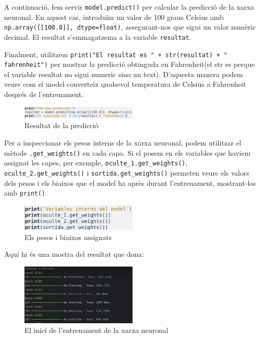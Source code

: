 A continuació, fem servir \texttt{model.predict()} per calcular la predicció de la xarxa neuronal. En aquest cas, introduïm un valor de 100 graus Celsius amb \texttt{np.array([[100.0]], dtype=float)}, assegurant-nos que sigui un valor numèric decimal. El resultat s’emmagatzema a la variable \texttt{resultat}.

Finalment, utilitzem \texttt{print("El resultat es " + str(resultat) + " fahrenheit")} per mostrar la predicció obtinguda en Fahrenheit(el str es perque el variable resultat no sigui numeric sino un text). D’aquesta manera podem veure com el model converteix qualsevol temperatura de Celsius a Fahrenheit després de l’entrenament.


\begin{figure}[H]
    \centering
    \includegraphics[width=0.5\textwidth]{./figures/8.png}
    \caption{Resultat de la predicció}
\end{figure}

Per a inspeccionar els pesos interns de la xarxa neuronal, podem utilitzar el mètode \texttt{.get\_weights()} en cada capa. Si el posem en els variables que haviem assignat les capes, per exemple, \texttt{oculte\_1.get\_weights()}, \texttt{oculte\_2.get\_weights()} i \texttt{sortida.get\_weights()} permeten veure els valors dels pesos i els biaixos que el model ha après durant l’entrenament, mostrant-los amb \texttt{print()}.


\begin{figure}[H]
    \centering
    \includegraphics[width=0.5\textwidth]{./figures/9.png}
    \caption{Els pesos i biaixos assignats}
\end{figure}

Aquí hi és una mostra del resultat que dona:

\begin{figure}[H]
    \centering
    \includegraphics[width=0.5\textwidth]{./figures/10.png}
    \caption{El inicí de l'entrenament de la xarxa neuronal}
\end{figure}

